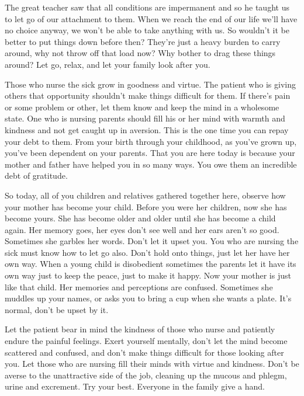 The great teacher saw that all conditions are impermanent and so he taught us to let go of our attachment to them. When we reach the end of our life we'll have no choice anyway, we won't be able to take anything with us. So wouldn't it be better to put things down before then? They're just a heavy burden to carry around, why not throw off that load now? Why bother to drag these things around? Let go, relax, and let your family look after you. 

Those who nurse the sick grow in goodness and virtue. The patient who is giving others that opportunity shouldn't make things difficult for them. If there's pain or some problem or other, let them know and keep the mind in a wholesome state. One who is nursing parents should fill his or her mind with warmth and kindness and not get caught up in aversion. This is the one time you can repay your debt to them. From your birth through your childhood, as you've grown up, you've been dependent on your parents. That you are here today is because your mother and father have helped you in so many ways. You owe them an incredible debt of gratitude. 

So today, all of you children and relatives gathered together here, observe how your mother has become your child. Before you were her children, now she has become yours. She has become older and older until she has become a child again. Her memory goes, her eyes don't see well and her ears aren't so good. Sometimes she garbles her words. Don't let it upset you. You who are nursing the sick must know how to let go also. Don't hold onto things, just let her have her own way. When a young child is disobedient sometimes the parents let it have its own way just to keep the peace, just to make it happy. Now your mother is just like that child. Her memories and perceptions are confused. Sometimes she muddles up your names, or asks you to bring a cup when she wants a plate. It's normal, don't be upset by it. 

Let the patient bear in mind the kindness of those who nurse and patiently endure the painful feelings. Exert yourself mentally, don't let the mind become scattered and confused, and don't make things difficult for those looking after you. Let those who are nursing fill their minds with virtue and kindness. Don't be averse to the unattractive side of the job, cleaning up the mucous and phlegm, urine and excrement. Try your best. Everyone in the family give a hand. 

